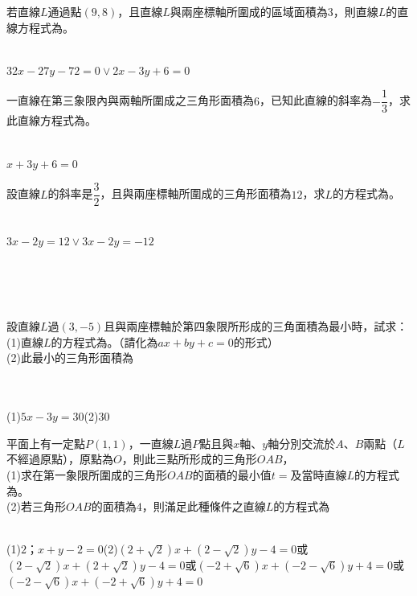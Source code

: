 \documentclass
[answers]
{exam}
\newcommand\ul[1]{\uline{\hspace*{#1}}}
\theoremstyle{definition}
\begin{document}
\begin{questions}
若直線$L$通過點$\left( 9,8\right)$，且直線$L$與兩座標軸所圍成的區域面積為$3$，則直線$L$的直線方程式為\ul{50pt}。
\\ 
\begin{solution}~\\
	$32x-27y-72=0 \vee 2x-3y+6=0 $
\end{solution}

\question

一直線在第三象限內與兩軸所圍成之三角形面積為$6$，已知此直線的斜率為$-\dfrac{1}{3}$，求此直線方程式為\ul{50pt}。
\\ 
\begin{solution}~\\
	$x+3y+6=0$
\end{solution}

\question

設直線$L$的斜率是$\dfrac{3}{2}$，且與兩座標軸所圍成的三角形面積為$12$，求$L$的方程式為\ul{50pt}。
\\ 
\begin{solution}~\\
	$3x-2y=12 \vee 3x-2y = -12$
\end{solution}
$ $\\$ $\\$ $\\
\question

設直線$L$過$\left( 3,-5\right)$且與兩座標軸於第四象限所形成的三角面積為最小時，試求：\\
(1)直線$L$的方程式為\ul{50pt}。（請化為$ax+by+c=0$的形式）\\
(2)此最小的三角形面積為\ul{50pt}\\
\\ 
\begin{solution}~\\
	(1)$5x-3y = 30$(2)$30$
\end{solution}

\question

平面上有一定點$P\left( 1,1\right)$，一直線$L$過$P$點且與$x$軸、$y$軸分別交流於$A$、$B$兩點（$L$不經過原點），原點為$O$，則此三點所形成的三角形$OAB$，\\
(1)求在第一象限所圍成的三角形$OAB$的面積的最小值$t=$\ul{50pt}及當時直線$L$的方程式為\ul{50pt}。\\
(2)若三角形$OAB$的面積為$4$，則滿足此種條件之直線$L$的方程式為\ul{50pt}
\\ 
\begin{solution}~\\
	(1)$2$；$x+y-2=0$(2)$\left( 2 + \sqrt{2}\right) x + \left( 2-\sqrt{2}\right) y -4=0$或$\left( 2 - \sqrt{2}\right) x + \left( 2+\sqrt{2}\right) y -4=0$或$\left( -2 + \sqrt{6}\right) x + \left( -2 -\sqrt{6}\right) y +4=0$或$\left( -2 - \sqrt{6}\right) x + \left( -2 +\sqrt{6}\right) y +4=0$
\end{solution}

\end{questions}
\end{document}
